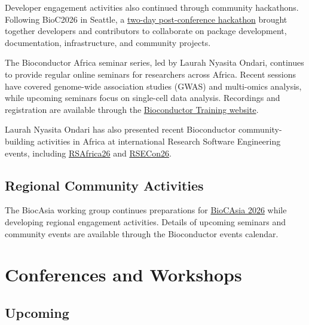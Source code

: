 Developer engagement activities also continued through community hackathons. Following BioC2026 in Seattle, a \href{https://github.com/BiocCodingCollaborations/BiocNA2026_Hackathon}{two-day post-conference hackathon} brought together developers and contributors to collaborate on package development, documentation, infrastructure, and community projects.

The Bioconductor Africa seminar series, led by Laurah Nyasita Ondari, continues to provide regular online seminars for researchers across Africa. Recent sessions have covered genome-wide association studies (GWAS) and multi-omics analysis, while upcoming seminars focus on single-cell data analysis. Recordings and registration are available through the \href{https://training.bioconductor.org/seminars/bioc-africa/index.html}{Bioconductor Training website}.

Laurah Nyasita Ondari has also presented recent Bioconductor community-building activities in Africa at international Research Software Engineering events, including \href{https://www.research-software-africa.org/program.html\#paper-11}{RSAfrica26} and \href{https://doi.org/10.5281/zenodo.22225674}{RSECon26}.

\subsection{Regional Community Activities}\label{regional-community-activities}

The BiocAsia working group continues preparations for \href{https://biocasia2026.bioconductor.org/}{BioCAsia 2026} while developing regional engagement activities. Details of upcoming seminars and community events are available through the Bioconductor events calendar.

\section{Conferences and Workshops}\label{conferences-and-workshops}

\subsection{Upcoming}\label{upcoming}

